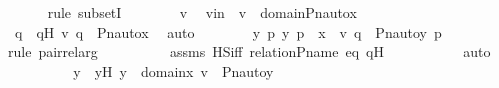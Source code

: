\begin{isabellebody}
\ \ \ \ \isamarkupfalse%
\ {\isacharparenleft}{\kern0pt}rule\ subsetI{\isacharparenright}{\kern0pt}\isanewline
\ \ \ \ \ \ \isamarkupfalse%
\ v\ \isamarkupfalse%
\ vin\ {\isacharcolon}{\kern0pt}\ {\isachardoublequoteopen}v\ {\isasymin}\ domain{\isacharparenleft}{\kern0pt}Pn{\isacharunderscore}{\kern0pt}auto{\isacharparenleft}{\kern0pt}{\isasympi}{\isacharparenright}{\kern0pt}{\isacharbackquote}{\kern0pt}x{\isacharparenright}{\kern0pt}{\isachardoublequoteclose}\ \isanewline
\ \ \ \ \ \ \isamarkupfalse%
\ \isamarkupfalse%
\ q\ \ qH{\isacharcolon}{\kern0pt}\ {\isachardoublequoteopen}{\isacharless}{\kern0pt}v{\isacharcomma}{\kern0pt}\ q{\isachargreater}{\kern0pt}\ {\isasymin}\ Pn{\isacharunderscore}{\kern0pt}auto{\isacharparenleft}{\kern0pt}{\isasympi}{\isacharparenright}{\kern0pt}{\isacharbackquote}{\kern0pt}x{\isachardoublequoteclose}\ \isamarkupfalse%
\ auto\isanewline
\ \ \ \ \ \ \isamarkupfalse%
\ {\isachardoublequoteopen}{\isasymexists}y{\isachardot}{\kern0pt}\ {\isasymexists}p{\isachardot}{\kern0pt}\ {\isacharless}{\kern0pt}y{\isacharcomma}{\kern0pt}\ p{\isachargreater}{\kern0pt}\ {\isasymin}\ x\ {\isasymand}\ {\isacharless}{\kern0pt}v{\isacharcomma}{\kern0pt}\ q{\isachargreater}{\kern0pt}\ {\isacharequal}{\kern0pt}\ {\isacharless}{\kern0pt}Pn{\isacharunderscore}{\kern0pt}auto{\isacharparenleft}{\kern0pt}{\isasympi}{\isacharparenright}{\kern0pt}{\isacharbackquote}{\kern0pt}y{\isacharcomma}{\kern0pt}\ {\isasympi}{\isacharbackquote}{\kern0pt}p{\isachargreater}{\kern0pt}{\isachardoublequoteclose}\ \isanewline
\ \ \ \ \ \ \ \ \isamarkupfalse%
{\isacharparenleft}{\kern0pt}rule\ pair{\isacharunderscore}{\kern0pt}rel{\isacharunderscore}{\kern0pt}arg{\isacharparenright}{\kern0pt}\isanewline
\ \ \ \ \ \ \ \ \isamarkupfalse%
\ assms{}\ HS{\isacharunderscore}{\kern0pt}iff\ relation{\isacharunderscore}{\kern0pt}P{\isacharunderscore}{\kern0pt}name\ eq\ qH\ \isanewline
\ \ \ \ \ \ \ \ \isamarkupfalse%
\ auto\isanewline
\ \ \ \ \ \ \isamarkupfalse%
\ \isamarkupfalse%
\ y\ \ yH{\isacharcolon}{\kern0pt}\ {\isachardoublequoteopen}y\ {\isasymin}\ domain{\isacharparenleft}{\kern0pt}x{\isacharparenright}{\kern0pt}{\isachardoublequoteclose}\ {\isachardoublequoteopen}v\ {\isacharequal}{\kern0pt}\ Pn{\isacharunderscore}{\kern0pt}auto{\isacharparenleft}{\kern0pt}{\isasympi}{\isacharparenright}{\kern0pt}{\isacharbackquote}{\kern0pt}y{\isachardoublequoteclose}\ \isamarkupfalse%

\end{isabellebody}
